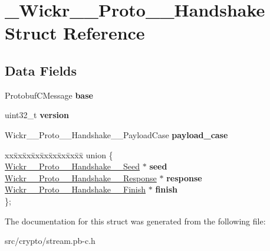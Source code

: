 \hypertarget{struct___wickr_____proto_____handshake}{}\section{\+\_\+\+Wickr\+\_\+\+\_\+\+Proto\+\_\+\+\_\+\+Handshake Struct Reference}
\label{struct___wickr_____proto_____handshake}
\subsection*{Data Fields}
\begin{DoxyCompactItemize}
\item 
\mbox{\label{struct___wickr_____proto_____handshake_a9f396a117ad48730614733f6d90fe0ea}} 
Protobuf\+C\+Message {\bfseries base}
\item 
\mbox{\label{struct___wickr_____proto_____handshake_a8d056b739d37c5bd8d875227a0a2ccbc}} 
uint32\+\_\+t {\bfseries version}
\item 
\mbox{\label{struct___wickr_____proto_____handshake_abd99e4c396ee822c22b0623e077a055a}} 
Wickr\+\_\+\+\_\+\+Proto\+\_\+\+\_\+\+Handshake\+\_\+\+\_\+\+Payload\+Case {\bfseries payload\+\_\+case}
\item 
\mbox{\label{struct___wickr_____proto_____handshake_a1233b32e5eedf320c5e476e974621bde}} 
\begin{tabbing}
xx\=xx\=xx\=xx\=xx\=xx\=xx\=xx\=xx\=\kill
union \{\\
\>\hyperlink{struct___wickr_____proto_____handshake_____seed}{Wickr\_\_Proto\_\_Handshake\_\_Seed} $\ast$ {\bfseries seed}\\
\>\hyperlink{struct___wickr_____proto_____handshake_____response}{Wickr\_\_Proto\_\_Handshake\_\_Response} $\ast$ {\bfseries response}\\
\>\hyperlink{struct___wickr_____proto_____handshake_____finish}{Wickr\_\_Proto\_\_Handshake\_\_Finish} $\ast$ {\bfseries finish}\\
\}; \\

\end{tabbing}\end{DoxyCompactItemize}


The documentation for this struct was generated from the following file\+:\begin{DoxyCompactItemize}
\item 
src/crypto/stream.\+pb-\/c.\+h\end{DoxyCompactItemize}
